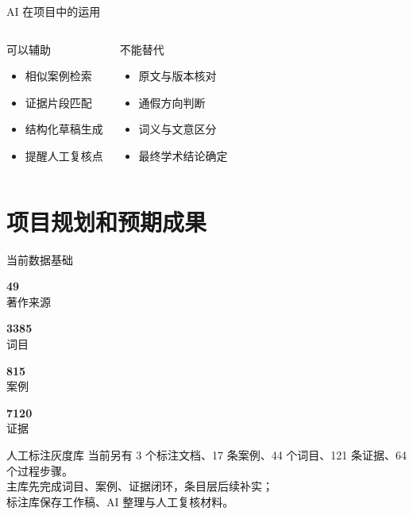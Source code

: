 \documentclass[aspectratio=169]{beamer}
\newcommand{\numstat}[2]{%
  \begin{minipage}{0.22\linewidth}
    \centering
    {\Huge\textcolor{rucRed}{\textbf{#1}}}\\[-1mm]
    {\small #2}
  \end{minipage}
}
\begin{document}
\begin{frame}{AI 在项目中的运用}
    \begin{columns}[T]
        \begin{block}{可以辅助}
            \begin{itemize}
                \item 相似案例检索
                \item 证据片段匹配
                \item 结构化草稿生成
                \item 提醒人工复核点
            \end{itemize}
        \end{block}
        \begin{block}{不能替代}
            \begin{itemize}
                \item 原文与版本核对
                \item 通假方向判断
                \item 词义与文意区分
                \item 最终学术结论确定
            \end{itemize}
        \end{block}
    \end{columns}
\end{frame}

\section{项目规划和预期成果}

\begin{frame}{当前数据基础}
    \vspace{0.25cm}
    \begin{center}
        \numstat{49}{著作来源}
        \numstat{3385}{词目}
        \numstat{815}{案例}
        \numstat{7120}{证据}
    \end{center}
    \vspace{0.6cm}
    \begin{block}{人工标注灰度库}
        当前另有 3 个标注文档、17 条案例、44 个词目、121 条证据、64 个过程步骤。\\
        主库先完成词目、案例、证据闭环，条目层后续补实；\\
        标注库保存工作稿、AI 整理与人工复核材料。
    \end{block}
\end{frame}
\end{document}
